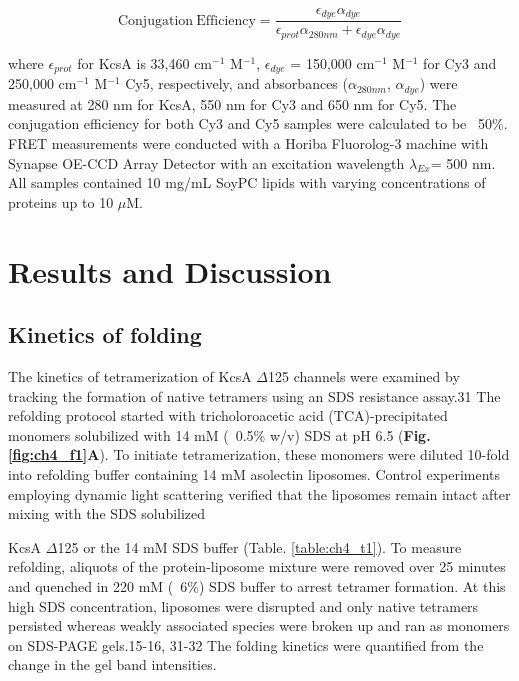 \begin{equation}
	\mathrm{Conjugation\ Efficiency} = \frac{\epsilon_{dye}\alpha_{dye}}{\epsilon_{prot}\alpha_{280nm}+\epsilon_{dye}\alpha_{dye}}
\end{equation}

where $\epsilon_{prot}$ for KcsA is 33,460 cm$^{-1}$ M$^{-1}$, $\epsilon_{dye}$ = 150,000 cm$^{-1}$ M$^{-1}$ for Cy3 and 250,000 cm$^{-1}$ M$^{-1}$ Cy5, respectively, and absorbances ($\alpha_{280nm}$, $\alpha_{dye}$) were measured at 280 nm for KcsA, 550 nm for Cy3 and 650 nm for Cy5. The conjugation efficiency for both Cy3 and Cy5 samples were calculated to be ~50\%. FRET measurements were conducted with a Horiba Fluorolog-3 machine with Synapse OE-CCD Array Detector with an excitation wavelength $\lambda_{Ex}$= 500 nm. All samples contained 10 mg/mL SoyPC lipids with varying concentrations of proteins up to 10 $\mu$M.

\section{Results and Discussion}

\subsection{Kinetics of folding}

The kinetics of tetramerization of KcsA $\Delta$125 channels were examined by tracking the formation of native tetramers using an SDS resistance assay.31 The refolding protocol started with tricholoroacetic acid (TCA)-precipitated monomers solubilized with 14 mM (~0.5\% w/v) SDS at pH 6.5 (\textbf{Fig. \ref{fig:ch4_f1}A}). To initiate tetramerization, these monomers were diluted 10-fold into refolding buffer containing 14 mM asolectin liposomes. Control experiments employing dynamic light scattering verified that the liposomes remain intact after mixing with the SDS solubilized

KcsA $\Delta$125 or the 14 mM SDS buffer (Table. \ref{table:ch4_t1}). To measure refolding, aliquots of the protein-liposome mixture were removed over 25 minutes and quenched in 220 mM (~6\%) SDS buffer to arrest tetramer formation. At this high SDS concentration, liposomes were disrupted and only native tetramers persisted whereas weakly associated species were broken up and ran as monomers on SDS-PAGE gels.15-16, 31-32 The folding kinetics were quantified from the change in the gel band intensities.

